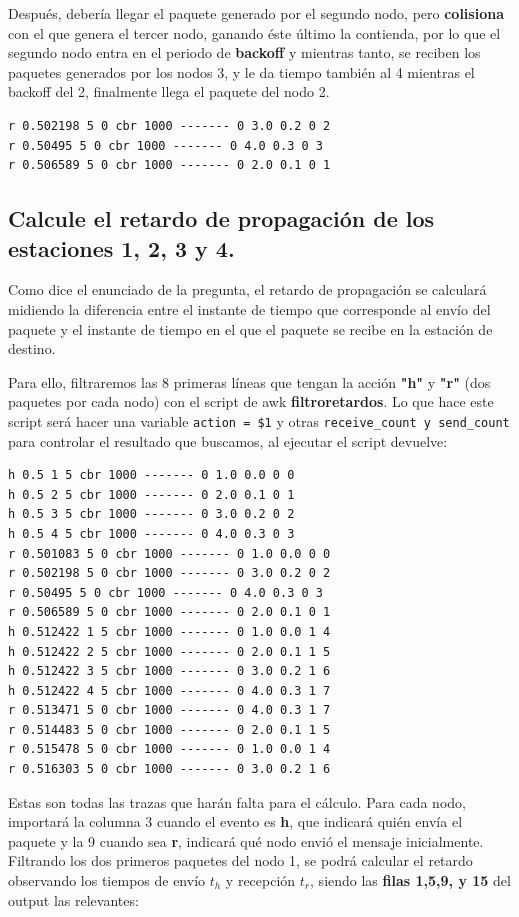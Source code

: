 \documentclass{article}
\begin{document}
Después, debería llegar el paquete generado por el segundo nodo, pero \textbf{colisiona} con el que genera el tercer nodo, ganando éste último la contienda, por lo que el segundo nodo entra en el periodo de \textbf{backoff} y mientras tanto, se reciben los paquetes generados por los nodos 3, y le da tiempo también al 4 mientras el backoff del 2, finalmente llega el paquete del nodo 2.

\begin{verbatim}
r 0.502198 5 0 cbr 1000 ------- 0 3.0 0.2 0 2
r 0.50495 5 0 cbr 1000 ------- 0 4.0 0.3 0 3
r 0.506589 5 0 cbr 1000 ------- 0 2.0 0.1 0 1
\end{verbatim}


\subsection{Calcule el retardo de propagación de los estaciones 1, 2, 3 y 4.}

Como dice el enunciado de la pregunta, el retardo de propagación se calculará midiendo la diferencia entre el instante de tiempo que corresponde al envío del paquete y el instante de tiempo en el que el paquete se recibe en la estación de destino.

Para ello, filtraremos las 8 primeras líneas que tengan la acción \textbf{"h"} y \textbf{"r"} (dos paquetes por cada nodo) con el script de awk \textbf{filtroretardos}.
Lo que hace este script será hacer una variable \verb|action = $1| y otras \verb|receive_count y send_count| para controlar el resultado que buscamos, al ejecutar el script devuelve:
\begin{verbatim}
h 0.5 1 5 cbr 1000 ------- 0 1.0 0.0 0 0
h 0.5 2 5 cbr 1000 ------- 0 2.0 0.1 0 1
h 0.5 3 5 cbr 1000 ------- 0 3.0 0.2 0 2
h 0.5 4 5 cbr 1000 ------- 0 4.0 0.3 0 3
r 0.501083 5 0 cbr 1000 ------- 0 1.0 0.0 0 0
r 0.502198 5 0 cbr 1000 ------- 0 3.0 0.2 0 2
r 0.50495 5 0 cbr 1000 ------- 0 4.0 0.3 0 3
r 0.506589 5 0 cbr 1000 ------- 0 2.0 0.1 0 1
h 0.512422 1 5 cbr 1000 ------- 0 1.0 0.0 1 4
h 0.512422 2 5 cbr 1000 ------- 0 2.0 0.1 1 5
h 0.512422 3 5 cbr 1000 ------- 0 3.0 0.2 1 6
h 0.512422 4 5 cbr 1000 ------- 0 4.0 0.3 1 7
r 0.513471 5 0 cbr 1000 ------- 0 4.0 0.3 1 7
r 0.514483 5 0 cbr 1000 ------- 0 2.0 0.1 1 5
r 0.515478 5 0 cbr 1000 ------- 0 1.0 0.0 1 4
r 0.516303 5 0 cbr 1000 ------- 0 3.0 0.2 1 6
\end{verbatim}

Estas son todas las trazas que harán falta para el cálculo. Para cada nodo, importará la columna 3 cuando el evento es \textbf{h}, que indicará quién envía el paquete y la 9 cuando sea \textbf{r}, indicará qué nodo envió el mensaje inicialmente.
Filtrando los dos primeros paquetes del nodo 1, se podrá calcular el retardo observando los tiempos de envío \(t_h\) y recepción \(t_r \), siendo las \textbf{filas 1,5,9, y 15} del output las relevantes:
\end{document}
